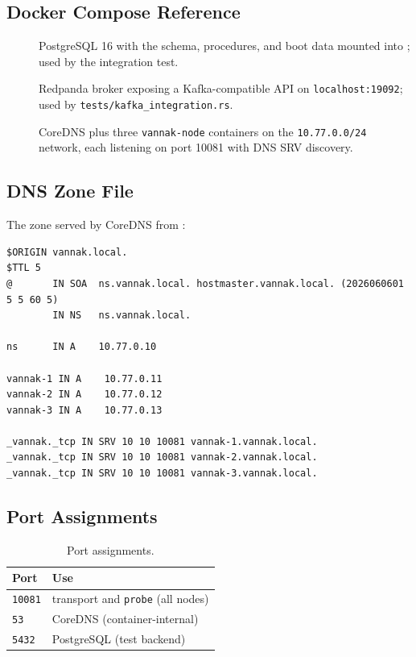 \subsection{Docker Compose Reference}

\begin{description}
\item[] PostgreSQL 16 with the \ipto{} schema,
  procedures, and boot data mounted into ;
  used by the integration test.
\item[] Redpanda broker exposing a
  Kafka-compatible API on \texttt{localhost:19092}; used by
  \texttt{tests/kafka\_integration.rs}.
\item[] CoreDNS plus three
  \texttt{vannak-node} containers on the \texttt{10.77.0.0/24} network, each
  listening on port 10081 with DNS SRV discovery.
\end{description}

\subsection{DNS Zone File}

The zone served by CoreDNS from :

\begin{lstlisting}[numbers=none]
$ORIGIN vannak.local.
$TTL 5
@       IN SOA  ns.vannak.local. hostmaster.vannak.local. (2026060601 5 5 60 5)
        IN NS   ns.vannak.local.

ns      IN A    10.77.0.10

vannak-1 IN A    10.77.0.11
vannak-2 IN A    10.77.0.12
vannak-3 IN A    10.77.0.13

_vannak._tcp IN SRV 10 10 10081 vannak-1.vannak.local.
_vannak._tcp IN SRV 10 10 10081 vannak-2.vannak.local.
_vannak._tcp IN SRV 10 10 10081 vannak-3.vannak.local.
\end{lstlisting}

\subsection{Port Assignments}

\begin{table}[htbp]
\centering
\begin{tabular}{ll}
\hline
Port & Use \\
\hline
\texttt{10081} & \raft{} transport and \texttt{probe} (all nodes) \\
\texttt{53} & CoreDNS (container-internal) \\
\texttt{5432} & PostgreSQL (test backend) \\
\hline
\end{tabular}
\caption{Port assignments.}
\end{table}


